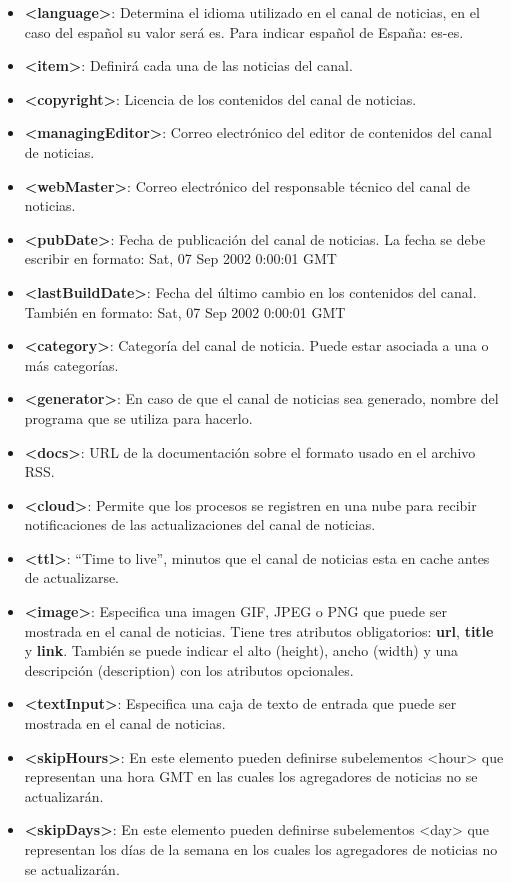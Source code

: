 \begin{enumerate}
    \begin{itemize}
        \item \textbf{<language>}: Determina el idioma utilizado en el canal de noticias, en el caso del español su valor será es. Para indicar español de España: es-es.
        \item \textbf{<item>}: Definirá cada una de las noticias del canal.
        \item \textbf{<copyright>}: Licencia de los contenidos del canal de noticias.
        \item \textbf{<managingEditor>}: Correo electrónico del editor de contenidos del canal de noticias.
        \item \textbf{<webMaster>}: Correo electrónico del responsable técnico del canal de noticias.
        \item \textbf{<pubDate>}: Fecha de publicación del canal de noticias. La fecha se debe escribir en formato: Sat, 07 Sep 2002 0:00:01 GMT
        \item \textbf{<lastBuildDate>}: Fecha del último cambio en los contenidos del canal. También en formato: Sat, 07 Sep 2002 0:00:01 GMT
        \item \textbf{<category>}: Categoría del canal de noticia. Puede estar asociada a una o más categorías.
        \item \textbf{<generator>}: En caso de que el canal de noticias sea generado, nombre del programa que se utiliza para hacerlo.
        \item \textbf{<docs>}: URL de la documentación sobre el formato usado en el archivo RSS.
        \item \textbf{<cloud>}: Permite que los procesos se registren en una nube para recibir notificaciones de las actualizaciones del canal de noticias.
        \item \textbf{<ttl>}: ``Time to live'', minutos que el canal de noticias esta en cache antes de actualizarse.
        \item \textbf{<image>}: Especifica una imagen GIF, JPEG o PNG que puede ser mostrada en el canal de noticias. Tiene tres atributos obligatorios: \textbf{url}, \textbf{title} y \textbf{link}. También se puede indicar el alto (height), ancho (width) y una descripción (description) con los atributos opcionales.
        \item \textbf{<textInput>}: Especifica una caja de texto de entrada que puede ser mostrada en el canal de noticias.
        \item \textbf{<skipHours>}: En este elemento pueden definirse subelementos <hour> que representan una hora GMT en las cuales los agregadores de noticias no se actualizarán.
        \item \textbf{<skipDays>}: En este elemento pueden definirse subelementos <day> que representan los días de la semana en los cuales los agregadores de noticias no se actualizarán.
    \end{itemize}


\end{enumerate}
